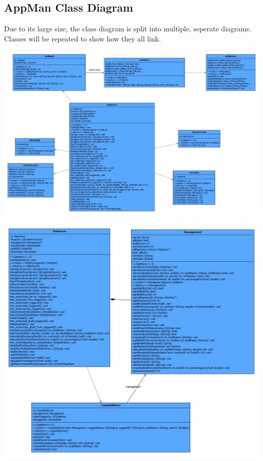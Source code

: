 \documentclass[a4paper,12pt,final]{article}
\begin{document}
\subsection{AppMan Class Diagram}
Due to its large size, the class diagram is split into multiple, seperate diagrams. Classes will be repeated to show how they all link.\\
\begin{center}
	\includegraphics[angle = 90,scale = 0.42]{MainformNew.jpg}
\end{center}
\begin{center}
	\includegraphics[angle = 90,scale = 0.5]{Mainformnew2.jpg}
\end{center}
\end{document}

